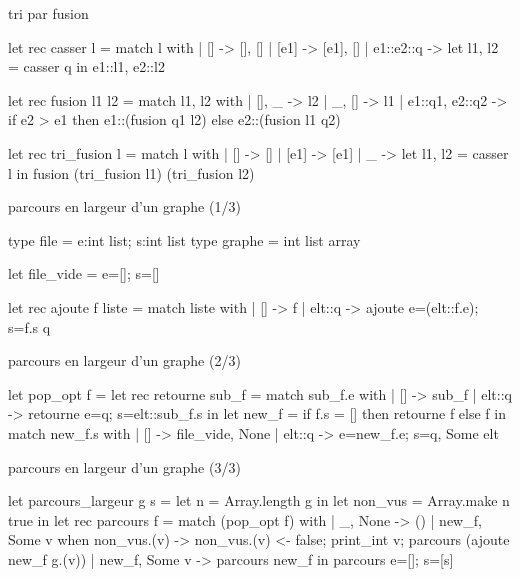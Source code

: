 

\begin{adjustwidth}{-3cm}{-3cm}


\begin{implementation}{tri par fusion}
    \begin{lstOCaml}
    let rec casser l =
        match l with
        | [] -> [], []
        | [e1] -> [e1], []
        | e1::e2::q -> 
            let l1, l2 = casser q in
            e1::l1, e2::l2

    let rec fusion l1 l2 = 
        match l1, l2 with
        | [], _ -> l2
        | _, [] -> l1
        | e1::q1, e2::q2 ->
            if e2 > e1 then
                e1::(fusion q1 l2)
            else
                e2::(fusion l1 q2)

    let rec tri_fusion l =
        match l with
        | [] -> []
        | [e1] -> [e1]
        | _ -> 
            let l1, l2 = casser l in
            fusion (tri_fusion l1) (tri_fusion l2)
    \end{lstOCaml}
\end{implementation}

\begin{implementation}{parcours en largeur d'un graphe (1/3)}
    \begin{lstOCaml}
    type file = {e:int list; s:int list}
    type graphe = int list array 
        
    let file_vide = {e=[]; s=[]}             
    
    let rec ajoute f liste = match liste with
        | [] -> f
        | elt::q -> ajoute {e=(elt::f.e); s=f.s} q 
    \end{lstOCaml}
\end{implementation}

\begin{implementation}{parcours en largeur d'un graphe (2/3)}
    \begin{lstOCaml}
    let pop_opt f = 
        let rec retourne sub_f =
            match sub_f.e with
            | [] -> sub_f
            | elt::q -> retourne {e=q; s=elt::sub_f.s}   
        in let new_f = 
            if f.s = [] then
                retourne f 
            else f 
        in match new_f.s with 
        | [] -> file_vide, None
        | elt::q -> {e=new_f.e; s=q}, Some elt
    \end{lstOCaml}
\end{implementation}

\begin{implementation}{parcours en largeur d'un graphe (3/3)}
    \begin{lstOCaml}
    let parcours_largeur g s =
        let n = Array.length g in
        let non_vus = Array.make n true in
        let rec parcours f =
            match (pop_opt f) with
            | _, None -> ()
            | new_f, Some v when non_vus.(v) ->
                non_vus.(v) <- false;
                print_int v;
                parcours (ajoute new_f g.(v))
            | new_f, Some v ->
                parcours new_f
        in parcours {e=[]; s=[s]} 
    \end{lstOCaml}
\end{implementation}


\end{adjustwidth}
